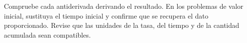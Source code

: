 \documentclass[11pt,a4paper]{article}
\begin{document}
\begin{alertbox}[title=Verificación final]
Compruebe cada antiderivada derivando el resultado. En los problemas de valor inicial, sustituya el tiempo inicial y confirme que se recupera el dato proporcionado. Revise que las unidades de la tasa, del tiempo y de la cantidad acumulada sean compatibles.
\end{alertbox}
\end{document}
